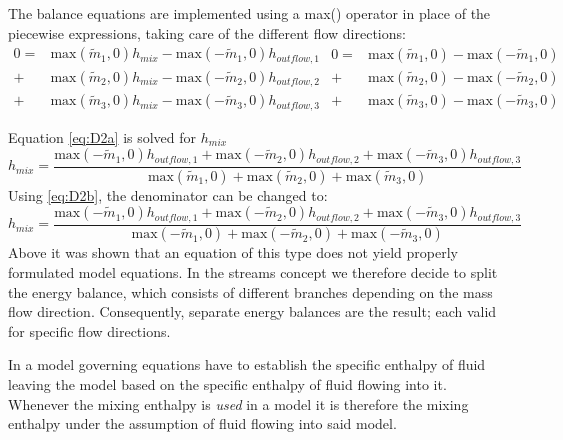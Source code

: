 The balance equations are implemented using a max() operator in place of
the piecewise expressions, taking care of the different flow directions:
\begin{subequations}
\begin{equation}
\begin{split}
0=&\text{max}(\tilde{m}_1,0)h_{mix}-\text{max}(-\tilde{m}_1,0)h_{outflow,1}\\
+&\text{max}(\tilde{m}_2,0)h_{mix}-\text{max}(-\tilde{m}_2,0)h_{outflow,2}\\
+&\text{max}(\tilde{m}_3,0)h_{mix}-\text{max}(-\tilde{m}_3,0)h_{outflow,3}
\end{split}
\label{eq:D2a}
\end{equation}

\begin{equation}
\begin{split}
0=&\text{max}(\tilde{m}_1,0)-\text{max}(-\tilde{m}_1,0)\\
+&\text{max}(\tilde{m}_2,0)-\text{max}(-\tilde{m}_2,0)\\
+&\text{max}(\tilde{m}_3,0)-\text{max}(-\tilde{m}_3,0)
\end{split}
\label{eq:D2b}
\end{equation}
\label{eq:D2}
\end{subequations}

Equation \eqref{eq:D2a} is solved for $h_{mix}$
\begin{equation*}
h_{mix}=\frac{\text{max}(-\tilde{m}_1,0)h_{outflow,1}+\text{max}(-\tilde{m}_2,0)h_{outflow,2}+\text{max}(-\tilde{m}_3,0)h_{outflow,3}}
{\text{max}(\tilde{m}_1,0)+\text{max}(\tilde{m}_2,0)+\text{max}(\tilde{m}_3,0)}
\end{equation*}
Using \eqref{eq:D2b}, the denominator can be changed to:
\begin{equation*}
h_{mix}=\frac{\text{max}(-\tilde{m}_1,0)h_{outflow,1}+\text{max}(-\tilde{m}_2,0)h_{outflow,2}+\text{max}(-\tilde{m}_3,0)h_{outflow,3}}
{\text{max}(-\tilde{m}_1,0)+\text{max}(-\tilde{m}_2,0)+\text{max}(-\tilde{m}_3,0)}
\end{equation*}
Above it was shown that an equation of this type does not yield properly
formulated model equations. In the streams concept we therefore decide
to split the energy balance, which consists of different branches
depending on the mass flow direction. Consequently, separate energy
balances are the result; each valid for specific flow directions.

In a model governing equations have to establish the specific enthalpy
of fluid leaving the model based on the specific enthalpy of fluid
flowing into it. Whenever the mixing enthalpy is \emph{used} in a model
it is therefore the mixing enthalpy under the assumption of fluid
flowing into said model.

